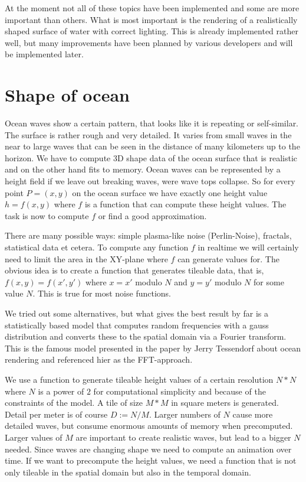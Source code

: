 \documentclass[english,a4paper,12pt]{report}
\begin{document}
At the moment not all of these topics have been implemented and some are
more important than others. What is most important is the rendering of a
realistically shaped surface of water with correct lighting. This is
already implemented rather well, but many improvements have been planned
by various developers and will be implemented later.

\section{Shape of ocean}

Ocean waves show a certain pattern, that looks like it is repeating or
self-similar. The surface is rather rough and very detailed. It varies
from small waves in the near to large waves that can be seen in the
distance of many kilometers up to the horizon. We have to compute 3D
shape data of the ocean surface that is realistic and on the other hand
fits to memory. Ocean waves can be represented by a height field if we
leave out breaking waves, were wave tops collapse. So for every point
$P=(x,y)$ on the ocean surface we have exactly one height value $h =
f(x,y)$ where $f$ is a function that can compute these height values.
The task is now to compute $f$ or find a good approximation.

There are many possible ways: simple plasma-like noise (Perlin-Noise),
fractals, statistical data et cetera. To compute any function $f$ in
realtime we will certainly need to limit the area in the XY-plane where
$f$ can generate values for. The obvious idea is to create a function
that generates tileable data, that is, $f(x,y) = f(x',y')$ where $x = x'
$ modulo $N$ and $y = y'$ modulo $N$ for some value $N$. This is true
for most noise functions.

We tried out some alternatives, but what gives the best result by far is
a statistically based model that computes random frequencies with a
gauss distribution and converts these to the spatial domain via a
Fourier transform. This is the famous model presented in the paper by
Jerry Tessendorf about ocean rendering and referenced hier as the
FFT-approach.

We use a function to generate tileable height values of a certain
resolution $N*N$ where $N$ is a power of $2$ for computational
simplicity and because of the constraints of the model. A tile of size
$M*M$ in square meters is generated. Detail per meter is of course $D :=
N/M$. Larger numbers of $N$ cause more detailed waves, but consume
enormous amounts of memory when precomputed. Larger values of $M$ are
important to create realistic waves, but lead to a bigger $N$ needed.
Since waves are changing shape we need to compute an animation over
time. If we want to precompute the height values, we need a function
that is not only tileable in the spatial domain but also in the temporal
domain.
\end{document}
